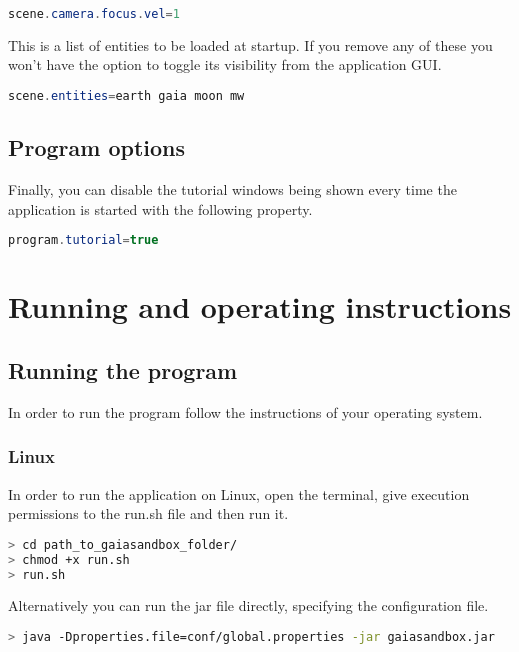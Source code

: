\documentclass[
a4paper, %
11pt, %
onecolumn, %
openany, %
]{memoir}
\begin{document}
\begin{lstlisting}[language=Java]
scene.camera.focus.vel=1
\end{lstlisting}

This is a list of entities to be loaded at startup. If you remove any of these
you won't have the option to toggle its visibility from the application GUI.

\begin{lstlisting}[language=Java]
scene.entities=earth gaia moon mw
\end{lstlisting}

\section{Program options}
Finally, you can disable the tutorial windows being shown every time the
application is started with the following property.

\begin{lstlisting}[language=Java]
program.tutorial=true
\end{lstlisting}

\chapter{Running and operating instructions}

\section{Running the program}
In order to run the program follow the instructions of your operating
system.

\subsection{Linux}
In order to run the application on Linux, open the terminal, give execution
permissions to the run.sh file and then run it.

\begin{lstlisting}[language=bash,basicstyle={\tiny\ttfamily}]
> cd path_to_gaiasandbox_folder/
> chmod +x run.sh
> run.sh
\end{lstlisting}

Alternatively you can run the jar file directly, specifying the configuration
file.

\begin{lstlisting}[language=bash,basicstyle={\tiny\ttfamily}]
> java -Dproperties.file=conf/global.properties -jar gaiasandbox.jar
\end{lstlisting}
\end{document}
